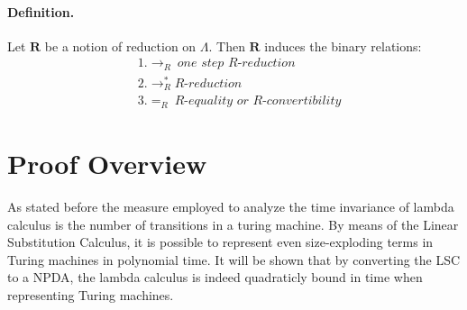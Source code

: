 \documentclass[12pt]{article}
\begin{document}
\paragraph{Definition.} Let $\textbf{R}$ be a notion of reduction on $\Lambda$. Then $\textbf{R}$ induces the binary relations:
\begin{equation}
  \begin{align}
          &1.  \rightarrow_{R} \ \textit{one step R-reduction} \\
          &2. \rightarrow_{R}^{*} \textit{R-reduction} \\
          &3. =_{R} \ \textit{R-equality or R-convertibility}
  \end{align}
\end{equation}

\section{Proof Overview}
As stated before the measure employed to analyze the time invariance of lambda calculus is the number of transitions in a turing machine. By means of the Linear Substitution Calculus, it is possible to represent even size-exploding terms in Turing machines in polynomial time. It will be shown that by converting the LSC to a NPDA, the lambda calculus is indeed quadraticly bound in time when representing Turing machines.
\end{document}
